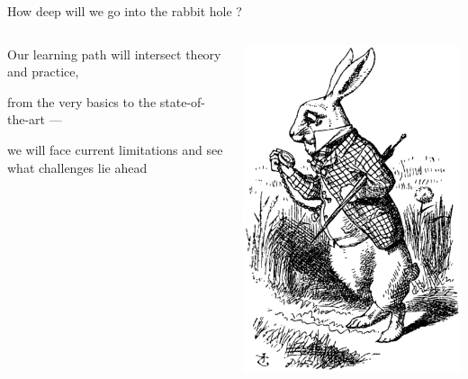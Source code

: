 \documentclass{beamer}
\begin{document}
\begin{frame}{How deep will we go into the rabbit hole ?}

  \begin{minipage}[1\textheight]{\textwidth}
  \begin{columns}[c]
  \begin{column}{0.8\textwidth}

    Our learning path will intersect theory and practice,
  
    from the very basics to the state-of-the-art ---

    we will face current limitations and see what challenges lie ahead 

  \end{column}
  \begin{column}{0.2\textwidth}
    
  \includegraphics[scale=1.4]{images/rabbit.png}
  \end{column}
  \end{columns}
  \end{minipage}

\end{frame}
\end{document}
